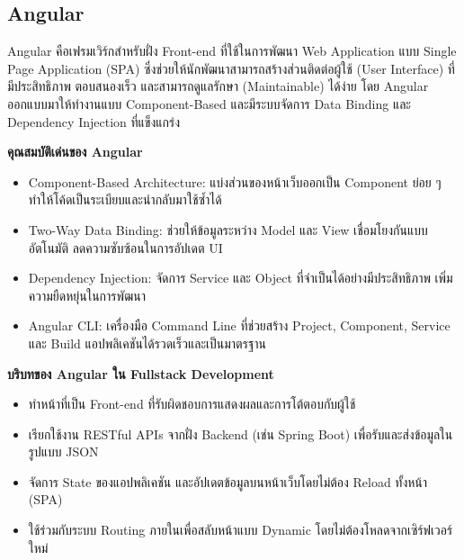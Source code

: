 \subsection{Angular}
Angular คือเฟรมเวิร์กสำหรับฝั่ง Front-end ที่ใช้ในการพัฒนา Web Application แบบ Single Page Application (SPA) 
ซึ่งช่วยให้นักพัฒนาสามารถสร้างส่วนติดต่อผู้ใช้ (User Interface) ที่มีประสิทธิภาพ ตอบสนองเร็ว 
และสามารถดูแลรักษา (Maintainable) ได้ง่าย โดย Angular ออกแบบมาให้ทำงานแบบ Component-Based 
และมีระบบจัดการ Data Binding และ Dependency Injection ที่แข็งแกร่ง\

\textbf{คุณสมบัติเด่นของ Angular}
\begin{itemize}
    \item Component-Based Architecture: แบ่งส่วนของหน้าเว็บออกเป็น Component ย่อย ๆ ทำให้โค้ดเป็นระเบียบและนำกลับมาใช้ซ้ำได้
    \item Two-Way Data Binding: ช่วยให้ข้อมูลระหว่าง Model และ View เชื่อมโยงกันแบบอัตโนมัติ ลดความซับซ้อนในการอัปเดต UI
    \item Dependency Injection: จัดการ Service และ Object ที่จำเป็นได้อย่างมีประสิทธิภาพ เพิ่มความยืดหยุ่นในการพัฒนา
    \item Angular CLI: เครื่องมือ Command Line ที่ช่วยสร้าง Project, Component, Service และ Build แอปพลิเคชันได้รวดเร็วและเป็นมาตรฐาน
\end{itemize}

\textbf{บริบทของ Angular ใน Fullstack Development}
\begin{itemize}
    \item ทำหน้าที่เป็น Front-end ที่รับผิดชอบการแสดงผลและการโต้ตอบกับผู้ใช้
    \item เรียกใช้งาน RESTful APIs จากฝั่ง Backend (เช่น Spring Boot) เพื่อรับและส่งข้อมูลในรูปแบบ JSON
    \item จัดการ State ของแอปพลิเคชัน และอัปเดตข้อมูลบนหน้าเว็บโดยไม่ต้อง Reload ทั้งหน้า (SPA)
    \item ใช้ร่วมกับระบบ Routing ภายในเพื่อสลับหน้าแบบ Dynamic โดยไม่ต้องโหลดจากเซิร์ฟเวอร์ใหม่
\end{itemize}